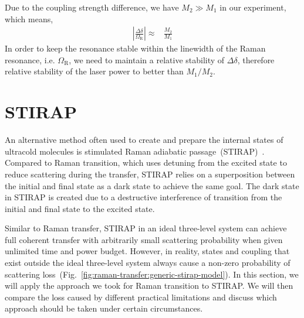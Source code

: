 Due to the coupling strength difference, we have $M_2\gg M_1$ in our experiment, which means,
\begin{align*}
  \left|\frac{\Delta\delta}{\Omega_{\mathrm{R}}}\right|\approx&\frac{M_2}{M_1}
\end{align*}
In order to keep the resonance stable within the linewidth of the Raman resonance,
i.e. $\Omega_{\mathrm{R}}$, we need to maintain a relative stability of $\Delta\delta$,
therefore relative stability of the laser power to better than $M_1/M_2$.

\section{STIRAP}
\label{ch:raman-transfer:stirap}

An alternative method often used to create and prepare the internal states of ultracold molecules
is stimulated Raman adiabatic passage~(STIRAP)~\cite{vitanov_coherent_2001}.
Compared to Raman transition, which uses detuning from the excited state
to reduce scattering during the transfer, STIRAP relies on a superposition between
the initial and final state as a dark state to achieve the same goal.
The dark state in STIRAP is created due to a destructive interference of transition
from the initial and final state to the excited state.

Similar to Raman transfer, STIRAP in an ideal three-level system can achieve
full coherent transfer with arbitrarily small scattering probability
when given unlimited time and power budget.
However, in reality, states and coupling that exist outside the ideal three-level system
always cause a non-zero probability of
scattering loss~(Fig.~\ref{fig:raman-transfer:generic-stirap-model}).
In this section, we will apply the approach we took for Raman transition to STIRAP.
We will then compare the loss caused by different practical limitations
and discuss which approach should be taken under certain circumstances.

